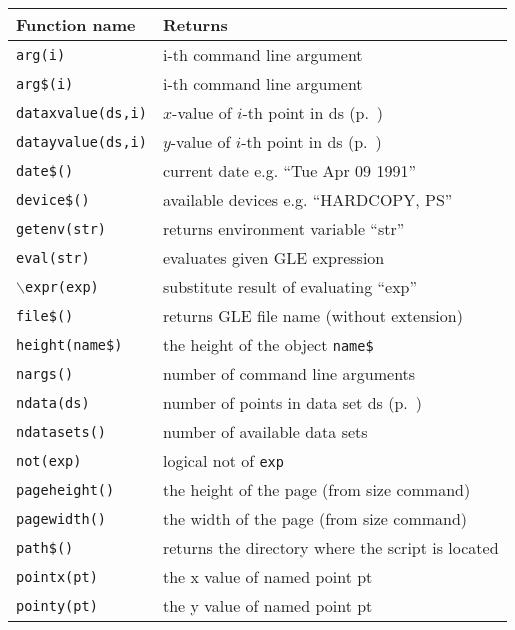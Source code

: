 \begin{supertabular}{ll} \hline
Function name     & Returns  \\ \hline
{\tt arg(i)}        	    & i-th command line argument \\
{\tt arg\$(i)}             & i-th command line argument \\
{\tt dataxvalue(ds,i)}  & $x$-value of $i$-th point in ds (p.~\pageref{dataxvalue})\\
{\tt datayvalue(ds,i)}  & $y$-value of $i$-th point in ds (p.~\pageref{datayvalue})\\
{\tt date\$()}       	& current date e.g. ``Tue Apr 09 1991'' \\
{\tt device\$()}   	& available devices e.g. ``HARDCOPY, PS''\\
{\tt getenv(str)}       & returns environment variable ``str''\\
{\tt eval(str)}          	& evaluates given GLE expression \\
{\tt $\backslash{}$expr(exp)}  & substitute result of evaluating ``exp'' \\
{\tt file\$()}          & returns GLE file name (without extension) \\
{\tt height(name\$)}  	& the height of the object {\tt name\$} \\
{\tt nargs()}        	& number of command line arguments \\
{\tt ndata(ds)}            & number of points in data set ds (p.~\pageref{ndata})\\
{\tt ndatasets()}      & number of available data sets\\
{\tt not(exp)}          	& logical not of {\tt exp} \\
{\tt pageheight()}  & the height of the page (from size command) \\
{\tt pagewidth()} 	& the width of the page (from size command) \\
{\tt path\$()}          & returns the directory where the script is located \\
{\tt pointx(pt)}     	& the x value of named point pt \\
{\tt pointy(pt)}     	& the y value of named point pt \\

\end{supertabular}
